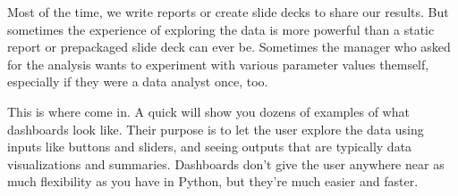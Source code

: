 \documentclass[letterpaper,10pt,english]{sphinxmanual}
\begin{document}
Most of the time, we write reports or create slide decks to share our results.  But sometimes the experience of exploring the data is more powerful than a static report or pre\sphinxhyphen{}packaged slide deck can ever be.  Sometimes the manager who asked for the analysis wants to experiment with various parameter values themself, especially if they were a data analyst once, too.

This is where  come in.  A quick  will show you dozens of examples of what dashboards look like.  Their purpose is to let the user explore the data using inputs like buttons and sliders, and seeing outputs that are typically data visualizations and summaries.  Dashboards don’t give the user anywhere near as much flexibility as you have in Python, but they’re much easier and faster.
\end{document}
